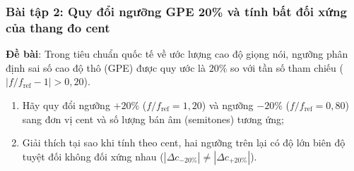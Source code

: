 \subsubsection*{Bài tập 2: Quy đổi ngưỡng GPE 20\% và tính bất đối xứng của thang đo cent}
\textbf{Đề bài}: Trong tiêu chuẩn quốc tế về ước lượng cao độ giọng nói, ngưỡng phân định sai số cao độ thô (GPE) được quy ước là $20\%$ so với tần số tham chiếu ($|f / f_{\text{ref}} - 1| > 0{,}20$).
\begin{enumerate}[label=(\alph*)]
    \item Hãy quy đổi ngưỡng $+20\%$ ($f / f_{\text{ref}} = 1{,}20$) và ngưỡng $-20\%$ ($f / f_{\text{ref}} = 0{,}80$) sang đơn vị cent và số lượng bán âm (semitones) tương ứng;
    \item Giải thích tại sao khi tính theo cent, hai ngưỡng trên lại có độ lớn biên độ tuyệt đối không đối xứng nhau ($|\Delta c_{-20\%}| \ne |\Delta c_{+20\%}|$).
\end{enumerate}

